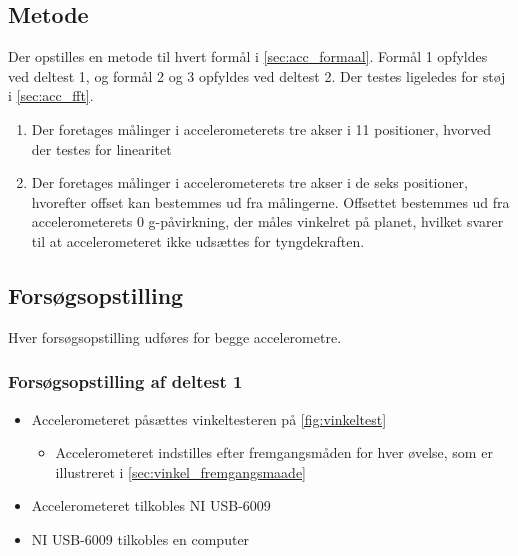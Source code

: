 \subsection{Metode}
Der opstilles en metode til hvert formål i \autoref{sec:acc_formaal}. Formål 1 opfyldes ved deltest 1, og formål 2 og 3 opfyldes ved deltest 2. Der testes ligeledes for støj i \autoref{sec:acc_fft}.
\begin{enumerate}
\item Der foretages målinger i accelerometerets tre akser i 11 positioner, hvorved der testes for linearitet
\item Der foretages målinger i accelerometerets tre akser i de seks positioner, hvorefter offset kan bestemmes ud fra målingerne. Offsettet bestemmes ud fra accelerometerets 0 g-påvirkning, der måles vinkelret på planet, hvilket svarer til at accelerometeret ikke udsættes for tyngdekraften.
\end{enumerate}

\subsection{Forsøgsopstilling}
Hver forsøgsopstilling udføres for begge accelerometre.

\subsubsection{Forsøgsopstilling af deltest 1}
\begin{itemize}
\item Accelerometeret påsættes vinkeltesteren på \autoref{fig:vinkeltest}
\begin{itemize}
\item Accelerometeret indstilles efter fremgangsmåden for hver øvelse, som er illustreret i \autoref{sec:vinkel_fremgangsmaade}
\end{itemize}
\item Accelerometeret tilkobles NI USB-6009
\item NI USB-6009 tilkobles en computer
\end{itemize}

